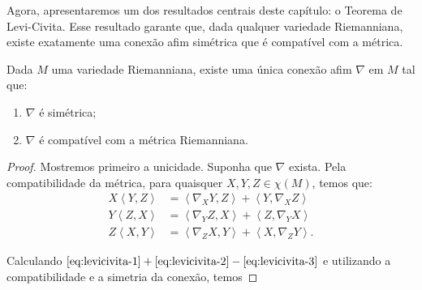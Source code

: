 Agora, apresentaremos um dos resultados centrais deste capítulo: o Teorema de Levi-Civita. Esse resultado garante que, dada qualquer variedade Riemanniana, existe exatamente uma conexão afim simétrica que é compatível com a métrica.
\begin{theorem}
	\label{teo:levi-civita}
	Dada $M$ uma variedade Riemanniana, existe uma única conexão afim $\nabla$ em $M$ tal que:
	\begin{enumerate}[label=(\roman*)]
		\item $\nabla$ é simétrica;
		\item $\nabla$ é compatível com a métrica Riemanniana.
	\end{enumerate}
	\begin{proof}

		Mostremos primeiro a unicidade.
		Suponha que $\nabla$ exista. Pela compatibilidade da métrica, para quaisquer $X, Y, Z \in \chi(M)$, temos que:
		\begin{align}
			X\left<Y,Z\right>  & = \left<\nabla_{X}Y,Z\right> +\left<Y,\nabla_{X}Z\right>   \label{eq:levicivita-1} \\
			Y\left<Z,X\right>  & = \left<\nabla_{Y}Z,X\right> + \left<Z,\nabla_{Y}X\right>  \label{eq:levicivita-2} \\
			Z \left<X,Y\right> & = \left<\nabla_{Z}X,Y\right> + \left<X,\nabla_{Z}Y\right>. \label{eq:levicivita-3}
		\end{align}

		Calculando $\eqref{eq:levicivita-1}+\eqref{eq:levicivita-2}-\eqref{eq:levicivita-3}$ e utilizando a compatibilidade e a simetria da conexão, temos


\end{proof}
\end{theorem}
